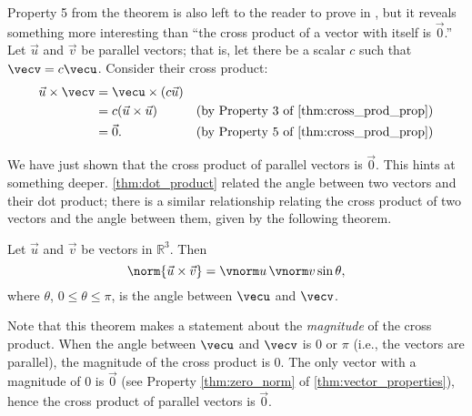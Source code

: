 Property 5 from the theorem is also left to the reader to prove in , but it reveals something more interesting than ``the cross product of a vector with itself is $\vec 0$.'' Let $\vec u$ and $\vec v$ be parallel vectors; that is, let there be a scalar $c$ such that $\vecv = c\vecu$. Consider their cross product:
\begin{align*}
	\vec u\times\vecv
	&= \vecu \times (c\vec u) \\
	&= c(\vec u\times\vec u) & \text{(by Property 3 of \autoref{thm:cross_prod_prop})} \\
	&= \vec 0. & \text{(by Property 5 of \autoref{thm:cross_prod_prop})}
\end{align*}

We have just shown that the cross product of parallel vectors is $\vec 0$. This hints at something deeper. \autoref{thm:dot_product} related the angle between two vectors and their dot product; there is a similar relationship relating the cross product of two vectors and the angle between them, given by the following theorem.

\begin{theorem}\label{thm:cross_product}%
Let $\vec u$ and $\vec v$ be vectors in $\mathbb{R}^3$. Then
\[\norm{\vec u\times\vec v} = \vnorm u\, \vnorm v \sin\theta,\]
where $\theta$, $0\leq \theta \leq \pi$, is the angle between $\vecu$ and $\vecv$.
\end{theorem}


Note that this theorem makes a statement about the \emph{magnitude} of the cross product. When the angle between $\vecu$ and $\vecv$ is 0 or $\pi$ (i.e., the vectors are parallel), the magnitude of the cross product is 0. The only vector with a magnitude of 0 is $\vec 0$ (see Property \ref{thm:zero_norm} of \autoref{thm:vector_properties}), hence the cross product of  parallel vectors is $\vec 0$.\bigskip

